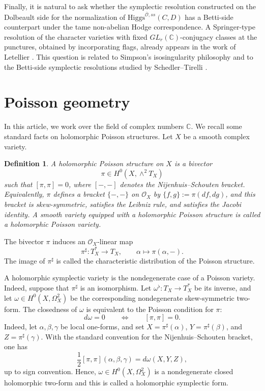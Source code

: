 \documentclass[11pt]{amsart}
\theoremstyle{plain}
\newtheorem{definition}[theorem]{Definition}
\theoremstyle{definition}
\theoremstyle{remark}
\newcommand{\C}{\mathbb C}
\newcommand{\cO}{\mathcal O}
\newcommand{\Higgs}{\mathrm{Higgs}}
\def\C{\mathbb{C}}
\begin{document}
	Finally, it is natural to ask whether the symplectic resolution constructed on the
	Dolbeault side for the normalization of $\Higgs^{\overline{\cO},ss}(C,D)$ has a
	Betti-side counterpart under the tame non-abelian Hodge correspondence. A Springer-type resolution of the character varieties with fixed $GL_r(\C)$-conjugacy classes at the punctures, obtained by incorporating flags, already appears in the work of Letellier \cite{Letellier2013CharacterClosures}. This question is related to Simpson's isosingularity philosophy \cite{simpsonmoduli, Tirelli2019SymplecticResolutionsHiggs} and
	to the Betti-side symplectic resolutions studied by Schedler--Tirelli \cite{SchedlerTirelli2022}.


\section{Poisson geometry}
In this article, we work over the field of complex numbers $\C$. We recall some standard facts on holomorphic Poisson structures. Let $X$ be a smooth complex variety.

\begin{definition}
A holomorphic Poisson structure on $X$ is a bivector
\[
\pi\in H^0(X,\wedge^2T_X)
\]
such that $[\pi,\pi]=0$, where $[-,-]$ denotes the Nijenhuis--Schouten bracket. Equivalently, $\pi$ defines a bracket $\{-,-\}$ on $\mathcal O_X$ by $\{f,g\}:=\pi(df,dg)$, and this bracket is skew-symmetric, satisfies the Leibniz rule, and satisfies the Jacobi identity. A smooth variety equipped with a holomorphic Poisson structure is called a holomorphic Poisson variety.
\end{definition}

The bivector $\pi$ induces an $\mathcal O_X$-linear map
\[
\pi^\sharp:T_X^*\longrightarrow T_X,
\qquad
\alpha\longmapsto \pi(\alpha,-).
\]
The image of $\pi^\sharp$ is called the characteristic distribution of the Poisson structure.

A holomorphic symplectic variety is the nondegenerate case of a Poisson variety. Indeed, suppose that $\pi^\sharp$ is an isomorphism. Let $\omega^\flat:T_X\to T_X^*$ be its inverse, and let $\omega\in H^0(X,\Omega_X^2)$ be the corresponding nondegenerate skew-symmetric two-form. The closedness of $\omega$ is equivalent to the Poisson condition for $\pi$:
\[
d\omega=0
\qquad\Longleftrightarrow\qquad
[\pi,\pi]=0.
\]
Indeed, let $\alpha,\beta,\gamma$ be local one-forms, and set $X=\pi^\sharp(\alpha)$, $Y=\pi^\sharp(\beta)$, and $Z=\pi^\sharp(\gamma)$. With the standard convention for the Nijenhuis--Schouten bracket, one has
\[
\frac{1}{2}[\pi,\pi](\alpha,\beta,\gamma)
=
d\omega(X,Y,Z),
\]
up to sign convention. Hence, $\omega\in H^0(X,\Omega_X^2)$ is a nondegenerate closed holomorphic two-form and this is called a holomorphic symplectic form.
\end{document}

